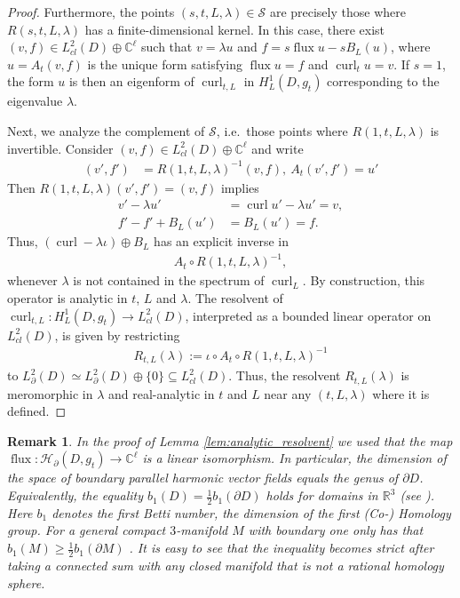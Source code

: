 \documentclass[11pt,reqno]{amsart}
\newtheorem{remark}{Remark}[section]
\DeclareMathOperator{\curl}{curl}
\DeclareMathOperator{\flux}{flux}
\begin{document}
\begin{proof}
    Furthermore, the points $(s,t,L,\lambda) \in \mathcal S$ are precisely those where $R(s,t,L,\lambda)$ has a finite-dimensional kernel. In this case, there exist $(v,f) \in L^2_{cl}(D) \oplus \mathbb C^{\ell}$ such that $v = \lambda u$ and $f = s \flux u - s B_L(u)$, where $u = A_t (v,f)$ is the unique form satisfying $\flux u = f$ and $\curl_t u = v$. If $s=1$, the form $u$ is then an eigenform of $\curl_{t,L}$ in $H^1_L(D,g_t)$ corresponding to the eigenvalue $\lambda$.
    
    Next, we analyze the complement of $\mathcal S$, i.e.\ those points where $R(1,t,L,\lambda)$ is invertible. Consider $(v,f) \in L^2_{cl}(D) \oplus \mathbb C^{\ell}$ and write 
    \begin{align*}
        (v',f') &= R(1,t,L,\lambda)^{-1}(v,f), \
        A_t (v',f') = u'
    \end{align*}
    Then $R(1,t,L,\lambda) (v',f') = (v,f)$ implies
    \begin{align*}
        v' - \lambda u' &= \curl u' - \lambda u' = v, \\
        f' - f' + B_L(u') &= B_L(u') = f.
    \end{align*}
    Thus, $(\curl - \lambda \iota) \oplus B_L$ has an explicit inverse in 
    \begin{align*}
        A_t \circ R(1,t,L,\lambda)^{-1},
    \end{align*}
    whenever $\lambda$ is not contained in the spectrum of $\curl_L$. By construction, this operator is analytic in $t$, $L$ and $\lambda$. The resolvent of $\curl_{t,L}: H^1_L(D,g_t) \to L^2_{cl}(D)$, interpreted as a bounded linear operator on $L^2_{cl}(D)$, is given by restricting
    \begin{align*}
        R_{t,L}(\lambda) := \iota \circ A_t \circ R(1,t,L,\lambda)^{-1}
    \end{align*}
    to $L^2_\partial(D) \simeq L^2_\partial(D) \oplus \{0\} \subseteq L^2_{cl}(D)$. Thus, the resolvent $R_{t,L}(\lambda)$ is meromorphic in $\lambda$ and real-analytic in $t$ and $L$ near any $(t,L,\lambda)$ where it is defined.
\end{proof}

\begin{remark}
  In the proof of Lemma \ref{lem:analytic_resolvent} we used that the map $\flux:\mathcal{H}_\partial (D,g_t)\to \mathbb C^\ell$ is a linear isomorphism. In particular, the dimension of the space of boundary parallel harmonic vector fields equals the genus of $\partial D$. Equivalently, the equality $b_1(D)=\frac{1}{2}b_1 (\partial D)$ holds for domains in $\mathbb R^3$ (see \cite[Theorem 1]{CantarellaDeTurckGluck2002topology}). Here $b_1$ denotes the first Betti number, the dimension of the first (Co-) Homology group. For a general compact $3$-manifold $M$ with boundary one only has that $b_1 (M)\geq \frac{1}{2}b_1 (\partial M)$ \cite[Corollary 9.1.5]{Martelli2016AnIT}. It is easy to see that the inequality becomes strict after taking a connected sum with any closed manifold that is not a rational homology sphere.
\end{remark}
\end{document}
